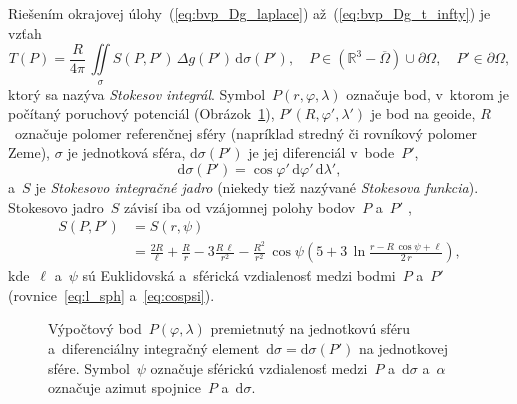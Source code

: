 \documentclass[a4paper, 12pt]{book}
\newcommand{\diff}{\mathrm d}
\begin{document}
Riešením okrajovej úlohy~(\ref{eq:bvp_Dg_laplace}) až~(\ref{eq:bvp_Dg_t_infty}) 
je vzťah
%
\begin{equation}
\label{eq:stokes}
T(P) = \frac{R}{4\pi} \, \iint\limits_{\sigma} S(P, P') \, \Delta g(P') \, 
\diff \sigma(P'){,} \quad P \in \left( \mathbb{R}^3 - \overline\Omega \right) 
\cup \partial\Omega{,} \quad P' \in \partial\Omega{,}
\end{equation}
%
ktorý sa nazýva \emph{Stokesov integrál}.  Symbol~$P(r, \varphi, \lambda)$ 
označuje bod, v~ktorom je počítaný poruchový potenciál 
(Obrázok~\ref{fig:surface_integral}), $P'(R, \varphi', \lambda')$ je bod na 
geoide, $R$~označuje polomer referenčnej sféry (napríklad stredný či rovníkový 
polomer Zeme), $\sigma$ je jednotková sféra, $\diff\sigma(P')$ je jej 
diferenciál v~bode~$P'$,
%
\begin{equation}
\label{eq:diff_sigma}
\diff\sigma(P') = \cos\varphi' \, \diff\varphi' \, \diff\lambda'{,}
\end{equation}
%
a~$S$ je \emph{Stokesovo integračné jadro} (niekedy tiež nazývané 
\emph{Stokesova funkcia}).  Stokesovo jadro~$S$ závisí iba od vzájomnej polohy 
bodov~$P$ a~$P'$ \parencite{MoritzPhysicalGeodesy},
%
\begin{equation}
\label{eq:stokes_kernel_general}
\begin{split}
S(P, P') &= S(r, \psi)\\
%
&= \frac{2R}{\ell} + \frac{R}{r} - 3\frac{R \, \ell}{r^2} - \frac{R^2}{r^2} \, 
\cos\psi\left( 5 + 3 \, \ln \frac{r - R \, \cos\psi + \ell}{2 \, r} \right){,}
\end{split}
\end{equation}
%
kde~$\ell$ a~$\psi$ sú Euklidovská a~sférická vzdialenosť medzi bodmi~$P$ 
a~$P'$ (rovnice~\ref{eq:l_sph} a~\ref{eq:cospsi}).

\begin{figure}[bt]
\centering

\caption{Výpočtový bod~$P(\varphi, \lambda)$ premietnutý na jednotkovú sféru 
a~diferenciálny integračný element~$\diff\sigma = \diff\sigma(P')$ na 
jednotkovej sfére.  Symbol~$\psi$ označuje sférickú vzdialenosť medzi~$P$ 
a~$\diff\sigma$ a~$\alpha$ označuje azimut spojnice~$P$ a~$\diff\sigma$.}
\label{fig:surface_integral}
\end{figure}
\end{document}
